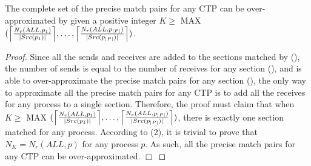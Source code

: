\begin{theorem}
The complete set of the precise match pairs for any CTP can be over-approximated by  given a positive integer $K \geq$ $\mathrm{MAX}$ $(\ceil*{\frac{N_r(ALL,p_1)}{|Src(p_1)|}},\ldots,\ceil*{\frac{N_r(ALL,p_{|P|})}{|Src(p_{|P|})|}})$.
\label{theorem:precise}
\end{theorem}
\begin{proof}
Since all the sends and receives are added to the sections matched by  (), the number of sends is equal to the number of receives for any section (), and  is able to over-approximate the precise match pairs for any section (), the only way to approximate all the precise match pairs for any CTP is to add all the receives for any process to a single section. Therefore, the proof must claim that when $K \geq$ $\mathrm{MAX}$ $(\ceil*{\frac{N_r(ALL,p_1)}{|Src(p_1)|}},\ldots,\ceil*{\frac{N_r(ALL,p_{|P|})}{|Src(p_{|P|})|}})$, there is exactly one section matched for any process. According to (2), it is trivial to prove that $N_K = N_r(ALL,p)$ for any process $p$. As such, all the precise match pairs for any CTP can be over-approximated.
$\Box$
\end{proof}

